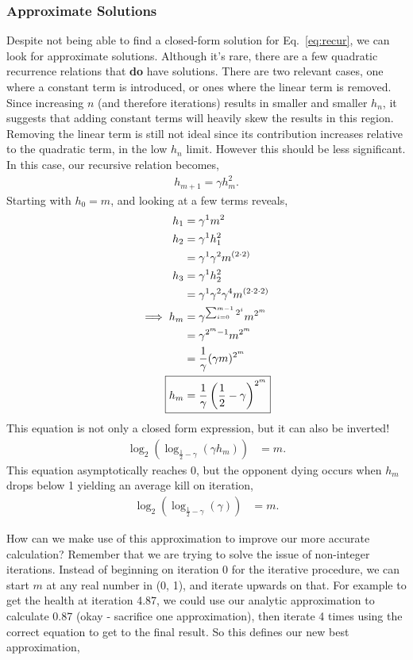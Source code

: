 \documentclass[../../main.tex]{subfiles}
\begin{document}
		\subsubsection{Approximate Solutions}
			Despite not being able to find a closed-form solution for Eq.~\ref{eq:recur}, we can look for approximate solutions. Although it's rare, there are a few quadratic recurrence relations that \textbf{do} have solutions. There are two relevant cases, one where a constant term is introduced, or ones where the linear term is removed. Since increasing $n$ (and therefore iterations) results in smaller and smaller $h_n$, it suggests that adding constant terms will heavily skew the results in this region. Removing the linear term is still not ideal since its contribution increases relative to the quadratic term, in the low $h_n$ limit. However this should be less significant. In this case, our recursive relation becomes,
			\begin{align}
				h_{m+1} = \gamma h_m^2.
			\end{align}
			Starting with $h_0 = m$, and looking at a few terms reveals,
			\begin{align}
				h_{1} &= \gamma^1 m^2\\
				h_{2} &= \gamma^1 h_1^2\\
					&= \gamma^1 \gamma^2 m^{(2\cdot2)}\\
				h_{3} &= \gamma^1 h_2^2\\
					&= \gamma^1 \gamma^2 \gamma^4 m^{(2\cdot2\cdot2)}\\
				\implies h_m &= \gamma^{\sum_{i=0}^{m-1} 2^i} m^{2^m}\\
							&= \gamma^{2^m-1} m^{2^m}\\
							&= \frac{1}{\gamma}(\gamma m)^{2^m}\\
						\Aboxed{h_m &= \frac{1}{\gamma}\left(\frac{1}{2} - \gamma\right)^{2^m}}
			\end{align}
			This equation is not only a closed form expression, but it can also be inverted!
			\begin{align}
				\log_2(\log_{\frac{1}{2} - \gamma} (\gamma h_m)) &= m.
			\end{align}
			This equation asymptotically reaches 0, but the opponent dying occurs when $h_m$ drops below 1 yielding an average kill on iteration,
			\begin{align}
				\log_2(\log_{\frac{1}{2} - \gamma} (\gamma)) &= m.
			\end{align}

			How can we make use of this approximation to improve our more accurate calculation? Remember that we are trying to solve the issue of non-integer iterations. Instead of beginning on iteration 0 for the iterative procedure, we can start $m$ at any real number in (0, 1), and iterate upwards on that. For example to get the health at iteration 4.87, we could use our analytic approximation to calculate 0.87 (okay - sacrifice one approximation), then iterate 4 times using the correct equation to get to the final result. So this defines our new best approximation,
\end{document}

